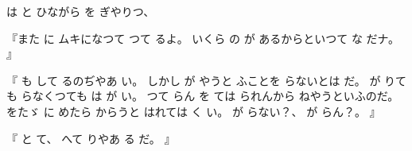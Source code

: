 
は
と
ひながら
を
ぎやりつ、

『また
に
ムキになつて
つて%
るよ。
いくら
の
が
あるからといつて
な
だナ。
』

『
も
して
るのぢやあ
い。
しかし
が
やうと
ふことを
らないとは
だ。
が
りても
らなくつても
は
が
い。
つて
らん
を
ては
られんから
ねやうといふのだ。
をたゞ
に
めたら
からうと
はれては
く
い。
が
らない？、
が
らん？。
』

『
と
て、
へて
りやあ
る
だ。
』


